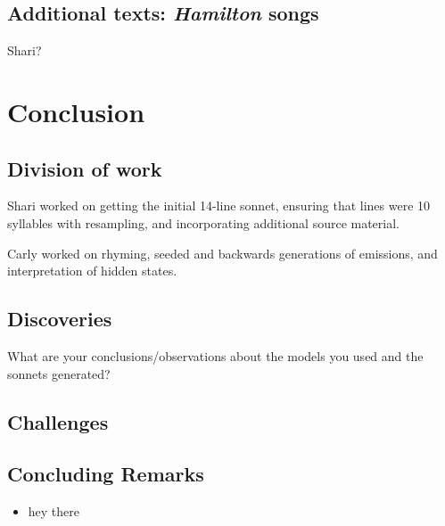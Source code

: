 \subsection{Additional texts: \emph{Hamilton} songs}
Shari?



\section{Conclusion}
\subsection{Division of work}
Shari worked on getting the initial 14-line sonnet, ensuring that lines were 10 syllables with resampling, and incorporating additional source material.

Carly worked on rhyming, seeded and backwards generations of emissions, and interpretation of hidden states.
\subsection{Discoveries}
What are your conclusions/observations about the models you used and the sonnets generated?
\subsection{Challenges}
\subsection{Concluding Remarks}

\begin{itemize}

\item hey there

\end{itemize}


